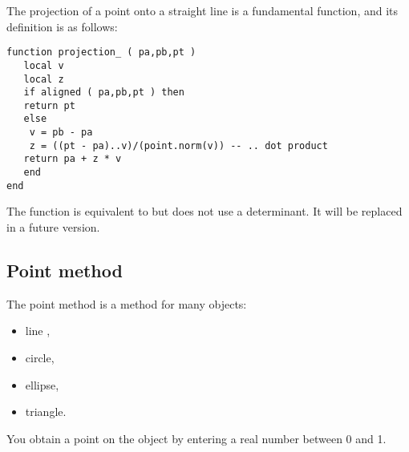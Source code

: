 The projection of a point onto a straight line is a fundamental function, and its definition is as follows:

\begin{verbatim}
function projection_ ( pa,pb,pt )
   local v
   local z
   if aligned ( pa,pb,pt ) then
   return pt
   else
    v = pb - pa
    z = ((pt - pa)..v)/(point.norm(v)) -- .. dot product
   return pa + z * v  
   end
end
\end{verbatim}

The function   is equivalent to    but does not use a determinant. It will be replaced in a future version.


\subsection{Point method} %
\label{sub:point_method}

The point  method is a method for many objects: 
\begin{itemize}
 \item line ,
 \item circle,
 \item ellipse,
 \item triangle.
\end{itemize}

You obtain a point on the object by entering a real number between 0 and 1. 

